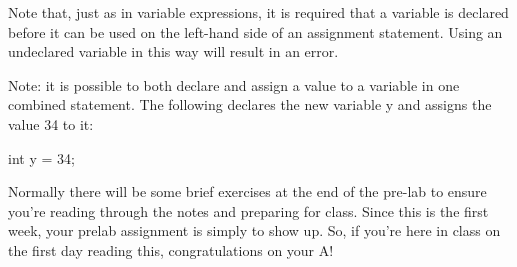 Note that, just as in variable expressions, it is required that a variable is
declared before it can be used on the left-hand side of an assignment statement. 
Using an undeclared variable in this way will result in an error. 

\begin{exa}
Note: it is possible to both declare and assign a value to a variable in one 
combined statement. The following declares the new variable y and assigns the value 34
to it:
\begin{code}
int y = 34;
\end{code}
\end{exa}


\begin{exer}
Normally there will be some brief exercises at the end of the pre-lab to ensure you're reading through the notes and preparing for class. Since this is the first week, your prelab assignment is simply to show up. So, if you're here in class 
on the first day reading this, congratulations on your A! 
\end{exer}